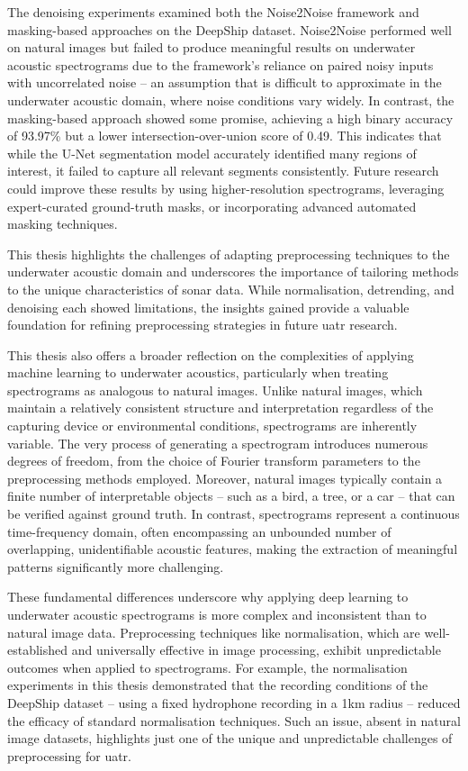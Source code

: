 The denoising experiments examined both the Noise2Noise framework and masking-based approaches on the DeepShip dataset. Noise2Noise performed well on natural images but failed to produce meaningful results on underwater acoustic spectrograms due to the framework’s reliance on paired noisy inputs with uncorrelated noise -- an assumption that is difficult to approximate in the underwater acoustic domain, where noise conditions vary widely. In contrast, the masking-based approach showed some promise, achieving a high binary accuracy of 93.97\% but a lower intersection-over-union score of 0.49. This indicates that while the U-Net segmentation model accurately identified many regions of interest, it failed to capture all relevant segments consistently. Future research could improve these results by using higher-resolution spectrograms, leveraging expert-curated ground-truth masks, or incorporating advanced automated masking techniques.

This thesis highlights the challenges of adapting preprocessing techniques to the underwater acoustic domain and underscores the importance of tailoring methods to the unique characteristics of sonar data. While normalisation, detrending, and denoising each showed limitations, the insights gained provide a valuable foundation for refining preprocessing strategies in future \acrshort{uatr} research.

This thesis also offers a broader reflection on the complexities of applying machine learning to underwater acoustics, particularly when treating spectrograms as analogous to natural images. Unlike natural images, which maintain a relatively consistent structure and interpretation regardless of the capturing device or environmental conditions, spectrograms are inherently variable. The very process of generating a spectrogram introduces numerous degrees of freedom, from the choice of Fourier transform parameters to the preprocessing methods employed. Moreover, natural images typically contain a finite number of interpretable objects -- such as a bird, a tree, or a car -- that can be verified against ground truth. In contrast, spectrograms represent a continuous time-frequency domain, often encompassing an unbounded number of overlapping, unidentifiable acoustic features, making the extraction of meaningful patterns significantly more challenging.

These fundamental differences underscore why applying deep learning to underwater acoustic spectrograms is more complex and inconsistent than to natural image data. Preprocessing techniques like normalisation, which are well-established and universally effective in image processing, exhibit unpredictable outcomes when applied to spectrograms. For example, the normalisation experiments in this thesis demonstrated that the recording conditions of the DeepShip dataset -- using a fixed hydrophone recording in a 1km radius -- reduced the efficacy of standard normalisation techniques. Such an issue, absent in natural image datasets, highlights just one of the unique and unpredictable challenges of preprocessing for \acrshort{uatr}.

